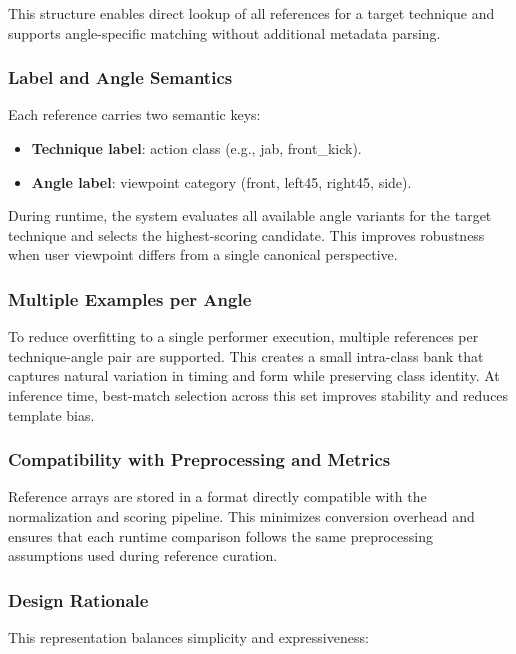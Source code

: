 \documentclass[12pt]{article}
\begin{document}
{This structure enables direct lookup of all references for a target technique and supports angle-specific matching without additional metadata parsing.

\subsubsection{Label and Angle Semantics}

Each reference carries two semantic keys:

\begin{itemize}
    \item \textbf{Technique label}: action class (e.g., jab, front\_kick).
    \item \textbf{Angle label}: viewpoint category (front, left45, right45, side).
\end{itemize}

During runtime, the system evaluates all available angle variants for the target technique and selects the highest-scoring candidate. This improves robustness when user viewpoint differs from a single canonical perspective.

\subsubsection{Multiple Examples per Angle}

To reduce overfitting to a single performer execution, multiple references per technique-angle pair are supported. This creates a small intra-class bank that captures natural variation in timing and form while preserving class identity. At inference time, best-match selection across this set improves stability and reduces template bias.

\subsubsection{Compatibility with Preprocessing and Metrics}

Reference arrays are stored in a format directly compatible with the normalization and scoring pipeline. This minimizes conversion overhead and ensures that each runtime comparison follows the same preprocessing assumptions used during reference curation.

\subsubsection{Design Rationale}

This representation balances simplicity and expressiveness:

}
\end{document}

